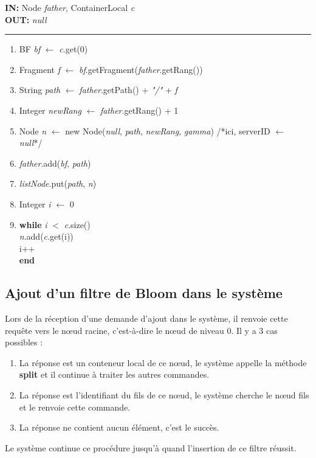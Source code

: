 \documentclass[a4paper,11pt]{report}
\begin{document}
\begin{flushleft}
	\begin{framed}
		\textbf{IN:} Node \textit{father}, ContainerLocal \textit{c}\\
		\textbf{OUT:} \textit{null}\\
		\noindent\rule{\linewidth}{0.5pt}

		\begin{enumerate}
			\item BF \textit{bf} $\leftarrow$ \textit{c}.get(0)
			\item Fragment \textit{f} $\leftarrow$ \textit{bf}.getFragment(\textit{father}.getRang())
			\item String \textit{path} $\leftarrow$ \textit{father}.getPath() + \textit{"/"} + \textit{f}
			\item Integer \textit{newRang} $\leftarrow$ \textit{father}.getRang() + 1
			\item Node \textit{n} $\leftarrow$ new Node(\textit{null}, \textit{path}, \textit{newRang}, \textit{gamma}) /*ici, serverID $\leftarrow$ \textit{null}*/
			\item \textit{father}.add(\textit{bf}, \textit{path})
			\item \textit{listNode}.put(\textit{path}, \textit{n})
			\item Integer \textit{i} $\leftarrow$ 0
			\item
				\begin{tabbing}
					\textbf{wh}\=\textbf{ile }\=\textit{i} $<$ \textit{c}.size()\\
						\> \textit{n}.add(\textit{c}.get(i))\\
						\> i++\\
					\textbf{end}
				\end{tabbing}									
		\end{enumerate}	
	\end{framed}
\end{flushleft}

	
\subsection{Ajout d'un filtre de Bloom dans le système}
	Lors de la réception d'une demande d'ajout dans le système, il renvoie cette requête vers le nœud racine, c'est-à-dire le nœud de niveau 0. Il y a 3 cas possibles : 
	\begin{enumerate}
		\item La réponse est un conteneur local de ce nœud, le système appelle la méthode \textbf{split} et il continue à traiter les autres commandes.
		\item La réponse est l'identifiant du fils de ce nœud, le système cherche le nœud fils et le renvoie cette commande.
		\item La réponse ne contient aucun élément, c'est le succès.
	\end{enumerate}
	Le système continue ce procédure jusqu'à quand l'insertion de ce filtre réussit.
	
\end{document}

